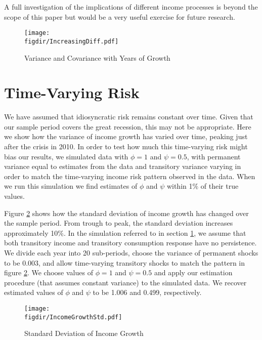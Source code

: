 \documentclass[titlepage]{\econtex}\newcommand{\texname}{ConsumptionHeterogeneity}
\newcommand{\figdir}{../Code/Rcode/Figures/AEJ_revision}
\begin{document}
	A full investigation of the implications of different income processes is beyond the scope of this paper but would be a very useful exercise for future research.
	
	\begin{figure} 
		\begin{centering}
			\texttt{[image: \\figdir/IncreasingDiff.pdf]}
			\caption{Variance and Covariance with Years of Growth}
			\label{fig:increasing_diff}
		\end{centering}
	\end{figure}
	
	\section{Time-Varying Risk} \label{time_varying_risk}
	\setcounter{figure}{0}   
	\setcounter{table}{0} 
	We have assumed that idiosyncratic risk remains constant over time. Given that our sample period covers the great recession, this may not be appropriate. Here we show how the variance of income growth has varied over time, peaking just after the crisis in 2010. In order to test how much this time-varying risk might bias our results, we simulated data with $\phi=1$ and $\psi=0.5$, with permanent variance equal to estimates from the data and transitory variance varying in order to match the time-varying income risk pattern observed in the data. When we run this simulation we find estimates of $\phi$ and $\psi$ within 1\% of their true values.
	
	Figure \ref{fig:income_growth_std} shows how the standard deviation of income growth has changed over the sample period. From trough to peak, the standard deviation increases approximately 10\%. In the simulation referred to in section \ref{time_varying_risk}, we assume that both transitory income and transitory consumption response have no persistence. We divide each year into 20 sub-periods, choose the variance of permanent shocks to be 0.003, and allow time-varying transitory shocks to match the pattern in figure \ref{fig:income_growth_std}. We choose values of $\phi=1$ and $\psi=0.5$ and apply our estimation procedure (that assumes constant variance) to the simulated data. We recover estimated values of $\phi$ and $\psi$ to be 1.006 and 0.499, respectively.
	\begin{figure} 
		\begin{centering}
			\texttt{[image: \\figdir/IncomeGrowthStd.pdf]}
			\caption{Standard Deviation of Income Growth}
			\label{fig:income_growth_std}
		\end{centering}
	\end{figure}
	
\end{document}
